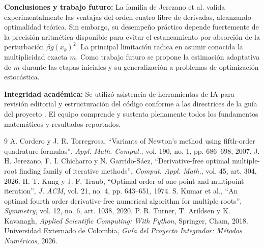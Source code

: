 \documentclass[10pt,a4paper]{article}
\begin{document}
\textbf{Conclusiones y trabajo futuro:} La familia de Jerezano et al. valida experimentalmente las ventajas del orden cuatro libre de derivadas, alcanzando optimalidad teórica. Sin embargo, su desempeño práctico depende fuertemente de la precisión aritmética disponible para evitar el estancamiento por absorción de la perturbación $\beta g(x_k)^2$. La principal limitación radica en asumir conocida la multiplicidad exacta $m$. Como trabajo futuro se propone la estimación adaptativa de $m$ durante las etapas iniciales y su generalización a problemas de optimización estocástica.

\textbf{Integridad académica:} Se utilizó asistencia de herramientas de IA para revisión editorial y estructuración del código conforme a las directrices de la guía del proyecto \cite{guia}. El equipo comprende y sustenta plenamente todos los fundamentos matemáticos y resultados reportados.

\begin{thebibliography}{9}\small
{} A. Cordero y J. R. Torregrosa, ``Variants of Newton's method using fifth-order quadrature formulas'', \emph{Appl. Math. Comput.}, vol. 190, no. 1, pp. 686--698, 2007.
 J. H. Jerezano, F. I. Chicharro y N. Garrido-Sáez, ``Derivative-free optimal multiple-root finding family of iterative methods'', \emph{Comput. Appl. Math.}, vol. 45, art. 304, 2026.
 H. T. Kung y J. F. Traub, ``Optimal order of one-point and multipoint iteration'', \emph{J. ACM}, vol. 21, no. 4, pp. 643--651, 1974.
 S. Kumar et al., ``An optimal fourth order derivative-free numerical algorithm for multiple roots'', \emph{Symmetry}, vol. 12, no. 6, art. 1038, 2020.
 P. R. Turner, T. Arildsen y K. Kavanagh, \emph{Applied Scientific Computing: With Python}, Springer, Cham, 2018.
 Universidad Externado de Colombia, \emph{Guía del Proyecto Integrador: Métodos Numéricos}, 2026.
\end{thebibliography}
\end{document}
